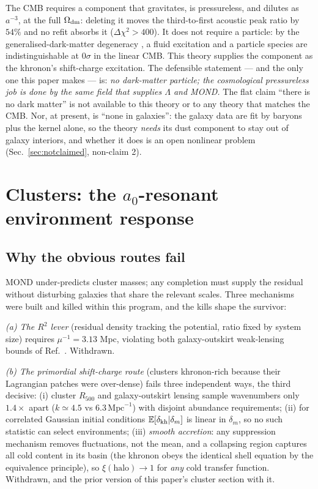 \documentclass[aps,prd,twocolumn,10pt,nofootinbib,superscriptaddress]{revtex4-2}
\begin{document}
The CMB requires a component that gravitates, is pressureless, and dilutes as $a^{-3}$, at the full
$\Omega_{\rm dm}$: deleting it moves the third-to-first acoustic peak ratio by $54\%$ and no refit
absorbs it ($\Delta\chi^2>400$). It does not require a particle: by the generalised-dark-matter
degeneracy \cite{Kopp2018}, a fluid excitation and a particle species are indistinguishable at
$0\sigma$ in the linear CMB. This theory supplies the component as the khronon's shift-charge
excitation. The defensible statement --- and the only one this paper makes --- is: \emph{no
dark-matter particle; the cosmological pressureless job is done by the same field that supplies
$\Lambda$ and MOND.} The flat claim ``there is no dark matter'' is not available to this theory or
to any theory that matches the CMB. Nor, at present, is ``none in galaxies'': the galaxy data are
fit by baryons plus the kernel alone, so the theory \emph{needs} its dust component to stay out of
galaxy interiors, and whether it does is an open nonlinear problem (Sec.~\ref{sec:notclaimed},
non-claim 2).

\section{Clusters: the $a_0$-resonant environment response}
\label{sec:clusters}

\subsection{Why the obvious routes fail}

MOND under-predicts cluster masses; any completion must supply the residual without disturbing
galaxies that share the relevant scales. Three mechanisms were built and killed within this
program, and the kills shape the survivor:

\emph{(a) The $R^2$ lever} (residual density tracking the potential, ratio fixed by system size)
requires $\mu^{-1}=3.13$ Mpc, violating both galaxy-outskirt weak-lensing bounds of
Ref.~\cite{Mistele2023}. Withdrawn.

\emph{(b) The primordial shift-charge route} (clusters khronon-rich because their Lagrangian
patches were over-dense) fails three independent ways, the third decisive: (i) cluster $R_{500}$
and galaxy-outskirt lensing sample wavenumbers only $1.4\times$ apart ($k\simeq4.5$ vs
$6.3\,\mathrm{Mpc}^{-1}$) with disjoint abundance requirements; (ii) for correlated Gaussian
initial conditions $\mathbb{E}[\delta_{\rm kh}|\delta_m]$ is linear in $\delta_m$, so no such
statistic can select environments; (iii) \emph{smooth accretion}: any suppression mechanism removes
fluctuations, not the mean, and a collapsing region captures all cold content in its basin
(the khronon obeys the identical shell equation by the equivalence principle), so
$\xi(\mathrm{halo})\to1$ for \emph{any} cold transfer function. Withdrawn, and the prior version of
this paper's cluster section with it.
\end{document}
